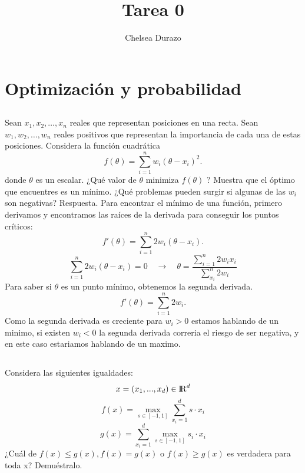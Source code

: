 \documentclass{article}
\title{Tarea 0}
\author{Chelsea Durazo}
\begin{document}
\maketitle

\section{Optimización y probabilidad}

\subsection{}

Sean $x_1, x_2, \ldots, x_n$ reales que representan posiciones en una recta. Sean $w_1, w_2, \ldots, w_n$ reales positivos que representan la importancia de cada una de estas posiciones. Considera la función cuadrática
\[f(\theta) = \sum^{n}_{i=1} w_i (\theta-x_i)^2.\]
donde $\theta$  es un escalar. ¿Qué valor de $\theta$ minimiza $f(\theta)$ ? Muestra que el óptimo que encuentres es un mínimo. ¿Qué problemas pueden surgir si algunas de las $w_i$ son negativas?\newline
\newline
Respuesta. \newline
Para encontrar el mínimo de una función, primero derivamos y encontramos las raíces de la derivada para conseguir los puntos críticos: \newline
\[f'(\theta) = \sum^{n}_{i=1} 2w_i (\theta-x_i).\]
\[\sum^{n}_{i=1} 2w_i (\theta-x_i) = 0  
\quad \rightarrow \quad 
\theta = \frac{\sum^{n}_{i=1} 2w_i x_i}{\sum^{n}_{x_i} 2w_i}\]
Para saber si $\theta$ es un punto mínimo, obtenemos la segunda derivada.
\[f'(\theta) = \sum^{n}_{i=1} 2w_i.\]
Como la segunda derivada es creciente para $w_i > 0$ estamos hablando de un minimo, si existen $w_i < 0$ la segunda derivada correria el riesgo de ser negativa, y en este caso estariamos hablando de un maximo.

\subsection{}

Considera las siguientes igualdades:\\

\[x = (x_1, . . . , x_d) \in {\rm I\!R}^d \]
\[f(x) = \max_{s\in[-1,1]}\sum^{d}_{x_i=1} s \cdot x_i\]
\[g(x) = \sum^{d}_{x_i=1} \max_{s\in[-1,1]} s_i \cdot x_i\]
¿Cuál de $f(x) \leq g(x), f(x) = g(x)$ o $f(x) \geq g(x)$ es verdadera para toda x? Demuéstralo.\\\\
\end{document}
